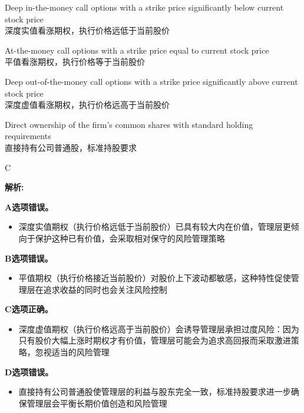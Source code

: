\documentclass{article}
\newenvironment{explanation}
{\textbf{解析:}\par}
{\par}
\begin{document}
\begin{choices}
    \item Deep in-the-money call options with a strike price significantly below current stock price\\
    深度实值看涨期权，执行价格远低于当前股价
    
    \item At-the-money call options with a strike price equal to current stock price\\
    平值看涨期权，执行价格等于当前股价
    
    \item Deep out-of-the-money call options with a strike price significantly above current stock price\\
    深度虚值看涨期权，执行价格远高于当前股价
    
    \item Direct ownership of the firm's common shares with standard holding requirements\\
    直接持有公司普通股，标准持股要求
\end{choices}

\begin{correctanswer}
    C
\end{correctanswer}

\begin{explanation}
    

    \textbf{A选项错误。}
    \begin{itemize}
        \item 深度实值期权（执行价格远低于当前股价）已具有较大内在价值，管理层更倾向于保护这种已有价值，会采取相对保守的风险管理策略
    \end{itemize}

    \textbf{B选项错误。}
    \begin{itemize}
        \item 平值期权（执行价格接近当前股价）对股价上下波动都敏感，这种特性促使管理层在追求收益的同时也会关注风险控制
    \end{itemize}

    \textbf{C选项正确。}
    \begin{itemize}
        \item 深度虚值期权（执行价格远高于当前股价）会诱导管理层承担过度风险：因为只有股价大幅上涨时期权才有价值，管理层可能会为追求高回报而采取激进策略，忽视适当的风险管理
    \end{itemize}

    \textbf{D选项错误。}
    \begin{itemize}
        \item 直接持有公司普通股使管理层的利益与股东完全一致，标准持股要求进一步确保管理层会平衡长期价值创造和风险管理
    \end{itemize}
\end{explanation}
\end{document}
